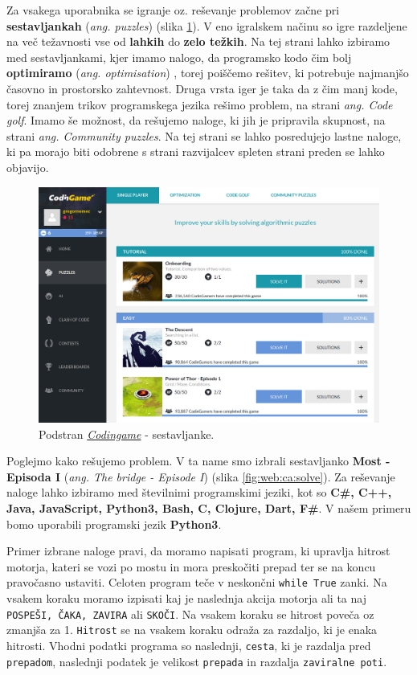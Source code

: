 Za vsakega uporabnika se igranje oz. reševanje problemov začne pri
\textbf{sestavljankah} (\emph{ang. puzzles}) (slika
\ref{fig:web:ca:puzz}). V eno igralskem načinu so igre razdeljene na
več težavnosti vse od \textbf{lahkih} do \textbf{zelo težkih}. Na tej
strani lahko izbiramo med sestavljankami, kjer imamo nalogo, da
programsko kodo čim bolj \textbf{optimiramo}
(\emph{ang. optimisation}) , torej poiščemo rešitev, ki potrebuje
najmanjšo časovno in prostorsko zahtevnost. Druga vrsta iger je taka
da z čim manj kode, torej znanjem trikov programskega jezika rešimo
problem, na strani \emph{ang. Code golf}. Imamo še možnost, da
rešujemo naloge, ki jih je pripravila skupnost, na strani
\emph{ang. Community puzzles}. Na tej strani se lahko posredujejo
lastne naloge, ki pa morajo biti odobrene s strani razvijalcev spleten
strani preden se lahko objavijo.  

\begin{figure}[h!]
  \centering
    \includegraphics [width=0.75\linewidth, keepaspectratio =
   1] {./images/sc_web/codingame_puzz-v01.jpg}
   \caption{Podstran \emph{\href{https://www.codingame.com}{Codingame}}
\cite{web:codingame} - sestavljanke.}
   \label{fig:web:ca:puzz}
 \end{figure}

 Poglejmo kako rešujemo problem. V ta name smo izbrali sestavljanko
 \textbf{Most - Episoda I} (\emph{ang. The bridge - Episode I}) (slika
 \ref{fig:web:ca:solve}). Za reševanje naloge lahko izbiramo med
 številnimi programskimi jeziki, kot so \textbf{C\#, C++, Java,
   JavaScript, Python3, Bash, C, Clojure, Dart, F\#}. V našem primeru
 bomo uporabili programski jezik \textbf{Python3}.
 
 Primer izbrane naloge pravi, da moramo napisati program, ki upravlja
 hitrost motorja, kateri se vozi po mostu in mora preskočiti prepad
 ter se na koncu pravočasno ustaviti. Celoten program teče v neskončni
 \texttt{while True} zanki. Na vsakem koraku moramo izpisati kaj je
 naslednja akcija motorja ali ta naj \texttt{POSPEŠI, ČAKA, ZAVIRA}
 ali \texttt{SKOČI}. Na vsakem koraku se hitrost poveča oz zmanjša za
 1. \texttt{Hitrost} se na vsakem koraku odraža za razdaljo, ki je
 enaka hitrosti. Vhodni podatki programa so naslednji, \texttt{cesta},
 ki je razdalja pred \texttt{prepadom}, naslednji podatek je velikost
 \texttt{prepada} in razdalja \texttt{zaviralne poti}.


